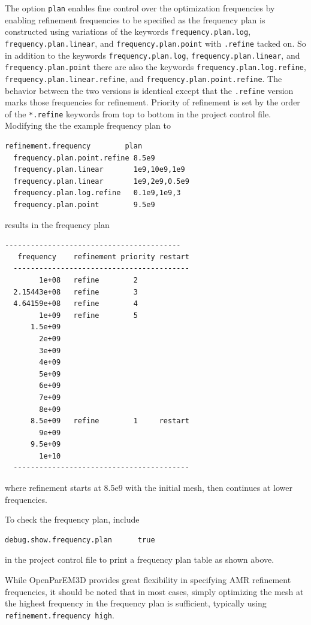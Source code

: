 \documentclass[titlepage]{article}
\renewcommand\_{\textunderscore\linebreak[1]}
\begin{document}
The option \texttt{plan} enables fine control over the optimization frequencies by enabling refinement frequencies to be specified as the frequency plan is constructed using variations of the keywords \texttt{frequency.plan.log}, \texttt{frequency.plan.linear}, and \texttt{frequency.plan.point} with \texttt{.refine} tacked on.  So in addition to the keywords \texttt{frequency.plan.log}, \texttt{frequency.plan.linear}, and \texttt{frequency.plan.point} there are also the keywords \texttt{frequency.plan.log.refine}, \texttt{frequency.plan.linear.refine}, and \newline\texttt{frequency.plan.point.refine}. The behavior between the two versions is identical except that the \texttt{.refine} version marks those frequencies for refinement.  Priority of refinement is set by the order of the \texttt{*.refine} keywords from top to bottom in the project control file.  Modifying the the example frequency plan to
\begin{Verbatim}[fontsize=\small]
  refinement.frequency        plan
  frequency.plan.point.refine 8.5e9
  frequency.plan.linear       1e9,10e9,1e9
  frequency.plan.linear       1e9,2e9,0.5e9
  frequency.plan.log.refine   0.1e9,1e9,3
  frequency.plan.point        9.5e9
\end{Verbatim}
\noindent results in the frequency plan
\begin{Verbatim}[fontsize=\small]
  -----------------------------------------
   frequency    refinement priority restart
  -----------------------------------------
        1e+08   refine        2
  2.15443e+08   refine        3
  4.64159e+08   refine        4
        1e+09   refine        5
      1.5e+09
        2e+09
        3e+09
        4e+09
        5e+09
        6e+09
        7e+09
        8e+09
      8.5e+09   refine        1     restart
        9e+09
      9.5e+09
        1e+10
  -----------------------------------------
\end{Verbatim}
\noindent where refinement starts at 8.5e9 with the initial mesh, then continues at lower frequencies.

To check the frequency plan, include 
\begin{Verbatim}[fontsize=\small]
  debug.show.frequency.plan      true
\end{Verbatim}
\noindent in the project control file to print a frequency plan table as shown above.

While OpenParEM3D provides great flexibility in specifying AMR refinement frequencies, it should be noted that in most cases, simply optimizing the mesh at the highest frequency in the frequency plan is sufficient, typically using \texttt{refinement.frequency high}.
\end{document}
